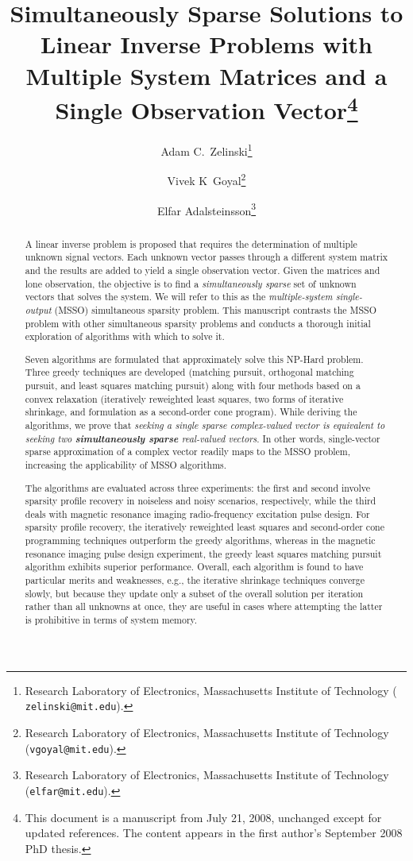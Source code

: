\documentclass[final]{siamltex}
\title{Simultaneously Sparse Solutions to Linear Inverse Problems with Multiple System Matrices and a Single Observation Vector\thanks{This document is a
   manuscript from July 21, 2008, unchanged except for updated references. 
   The content appears in the first author's September 2008 PhD thesis.}
}
\author{Adam C.~Zelinski\thanks{Research Laboratory of Electronics,
        Massachusetts Institute of Technology ({\tt
        zelinski@mit.edu}).}  \and Vivek K~Goyal\thanks{Research
        Laboratory of Electronics, Massachusetts Institute of
        Technology ({\tt vgoyal@mit.edu}).} \and Elfar
        Adalsteinsson\thanks{Research Laboratory of Electronics,
        Massachusetts Institute of Technology ({\tt elfar@mit.edu}).}}
\begin{document}
\maketitle

\begin{abstract}
  A linear inverse problem is proposed that requires the determination
  of multiple unknown signal vectors.  Each unknown vector passes
  through a different system matrix and the results are added to yield
  a single observation vector.  Given the matrices and lone
  observation, the objective is to find a {\em{simultaneously sparse}}
  set of unknown vectors that solves the system.  We will refer to
  this as the {\em{multiple-system single-output}} (MSSO) simultaneous
  sparsity problem.  This manuscript contrasts the MSSO problem with
  other simultaneous sparsity problems and conducts a thorough initial
  exploration of algorithms with which to solve it.

  Seven algorithms are formulated that approximately solve this
  NP-Hard problem.  Three greedy techniques are developed (matching
  pursuit, orthogonal matching pursuit, and least squares matching
  pursuit) along with four methods based on a convex relaxation
  (iteratively reweighted least squares, two forms of iterative
  shrinkage, and formulation as a second-order cone program).  While
  deriving the algorithms, we prove that {\em{seeking a single sparse
  complex-valued vector is equivalent to seeking two
  {\bf{simultaneously sparse}} real-valued vectors}}.  In other words,
  single-vector sparse approximation of a complex vector readily maps
  to the MSSO problem, increasing the applicability of MSSO
  algorithms.

  The algorithms are evaluated across three experiments: the first and
  second involve sparsity profile recovery in noiseless and noisy
  scenarios, respectively, while the third deals with magnetic
  resonance imaging radio-frequency excitation pulse design.  For
  sparsity profile recovery, the iteratively reweighted least squares
  and second-order cone programming techniques outperform the greedy
  algorithms, whereas in the magnetic resonance imaging pulse design
  experiment, the greedy least squares matching pursuit algorithm
  exhibits superior performance.  Overall, each algorithm is found to
  have particular merits and weaknesses, e.g., the iterative shrinkage
  techniques converge slowly, but because they update only a subset of
  the overall solution per iteration rather than all unknowns at once,
  they are useful in cases where attempting the latter is prohibitive
  in terms of system memory.  
\end{abstract}
\end{document}
